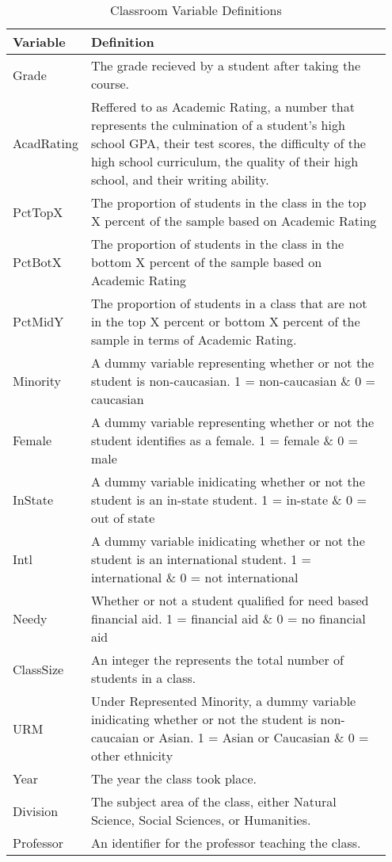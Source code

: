 \documentclass[12pt,a4paper,english,fleqn]{article}
\begin{document}
\begin{table}[htb]
\centering
\caption{Classroom Variable Definitions}\label{tab:def1}
 \begin{tabular}{|p{0.15\linewidth}|p{0.8\linewidth}|} 
 \hline\hline
 Variable & Definition \\ [0.5ex] 
 \hline\hline
 Grade & The grade recieved by a student after taking the course. \\ 
 \hline
 AcadRating & Reffered to as Academic Rating, a number that represents the culmination of a student's high school GPA, their test scores, the difficulty of the high school curriculum, the quality of their high school, and their writing ability. \\
 \hline
 PctTopX & The proportion of students in the class in the top X percent of the sample based on Academic Rating \\
 \hline
 PctBotX & The proportion of students in the class in the bottom X percent of the sample based on Academic Rating \\
 \hline
 PctMidY & The proportion of students in a class that are not in the top X percent or bottom X percent of the sample in terms of Academic Rating. \\
 \hline
 Minority & A dummy variable representing whether or not the student is non-caucasian. 1 = non-caucasian \& 0 = caucasian\\
 \hline
 Female & A dummy variable representing whether or not the student identifies as a female. 1 = female \& 0 = male\\
 \hline
 InState & A dummy variable inidicating whether or not the student is an in-state student.  1 = in-state \& 0 = out of state\\
 \hline
 Intl & A dummy variable inidicating whether or not the student is an international student.  1 = international \& 0 = not international\\
 \hline
 Needy & Whether or not a student qualified for need based financial aid.  1 = financial aid \& 0 = no financial aid\\
 \hline
 ClassSize & An integer the represents the total number of students in a class. \\
 \hline
 URM & Under Represented Minority, a dummy variable inidicating whether or not the student is non-caucaian or Asian.  1 = Asian or Caucasian \& 0 = other ethnicity \\
 \hline
 Year & The year the class took place. \\
 \hline
 Division & The subject area of the class, either Natural Science, Social Sciences, or Humanities. \\
 \hline
 Professor & An identifier for the professor teaching the class. \\
[1ex] 
 \hline\hline
\end{tabular}
\end{table}
\end{document}
